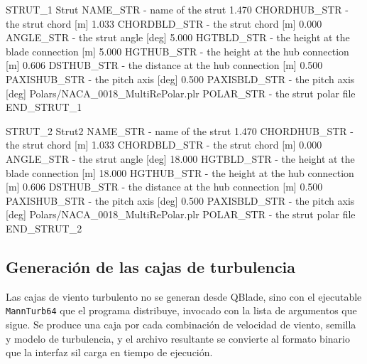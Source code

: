 \begin{cfgcode}
STRUT_1
    Strut                                          NAME_STR           - name of the strut
    1.470                                          CHORDHUB_STR       - the strut chord [m]
    1.033                                          CHORDBLD_STR       - the strut chord [m]
    0.000                                          ANGLE_STR          - the strut angle [deg]
    5.000                                          HGTBLD_STR         - the height at the blade connection [m]
    5.000                                          HGTHUB_STR         - the height at the hub connection [m]
    0.606                                          DSTHUB_STR         - the distance at the hub connection [m]
    0.500                                          PAXISHUB_STR       - the pitch axis [deg]
    0.500                                          PAXISBLD_STR       - the pitch axis [deg]
    Polars/NACA_0018_MultiRePolar.plr              POLAR_STR          - the strut polar file
END_STRUT_1

STRUT_2
    Strut2                                         NAME_STR           - name of the strut
    1.470                                          CHORDHUB_STR       - the strut chord [m]
    1.033                                          CHORDBLD_STR       - the strut chord [m]
    0.000                                          ANGLE_STR          - the strut angle [deg]
    18.000                                         HGTBLD_STR         - the height at the blade connection [m]
    18.000                                         HGTHUB_STR         - the height at the hub connection [m]
    0.606                                          DSTHUB_STR         - the distance at the hub connection [m]
    0.500                                          PAXISHUB_STR       - the pitch axis [deg]
    0.500                                          PAXISBLD_STR       - the pitch axis [deg]
    Polars/NACA_0018_MultiRePolar.plr              POLAR_STR          - the strut polar file
END_STRUT_2
\end{cfgcode}


\subsection*{Generación de las cajas de turbulencia}
\label{sec:anexo_mann}

Las cajas de viento turbulento no se generan desde QBlade, sino con el ejecutable
\texttt{MannTurb64} que el programa distribuye, invocado con la lista de argumentos que
sigue. Se produce una caja por cada combinación de velocidad de viento, semilla y modelo
de turbulencia, y el archivo resultante se convierte al formato binario que la interfaz
\gls{sil} carga en tiempo de ejecución.

